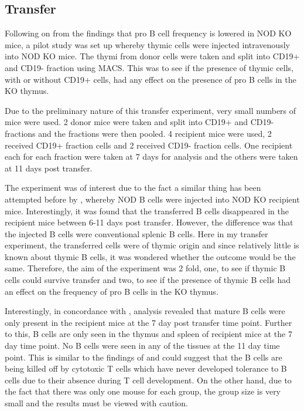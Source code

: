 


\subsection{Transfer}

Following on from the findings that pro B cell frequency is lowered in NOD KO mice, a pilot study was set up whereby thymic cells were injected intravenously into NOD KO mice.
The thymi from donor cells were taken and split into CD19+ and CD19- fraction using MACS.
This was to see if the presence of thymic cells, with or without CD19+ cells, had any effect on the presence of pro B cells in the KO thymus.

Due to the preliminary nature of this transfer experiment, very small numbers of mice were used.
2 donor mice were taken and split into CD19+ and CD19- fractions and the fractions were then pooled.
4 recipient mice were used, 2 received CD19+ fraction cells and 2 received CD19- fraction cells.
One recipient each for each fraction were taken at 7 days for analysis and the others were taken at 11 days post transfer.

The experiment was of interest due to the fact a similar thing has been attempted before by \citet{Serreze1998}, whereby NOD B cells were injected into NOD KO recipient mice.
Interestingly, it was found that the transferred B cells disappeared in the recipient mice between 6-11 days post transfer.
However, the difference was that the injected B cells were conventional splenic B cells.
Here in my transfer experiment, the transferred cells were of thymic origin and since relatively little is known about thymic B cells, it was wondered whether the outcome would be the same. 
Therefore, the aim of the experiment was 2 fold, one, to see if thymic B cells could survive transfer and two, to see if the presence of thymic B cells had an effect on the frequency of pro B cells in the KO thymus.

Interestingly, in concordance with \citet{Serreze1998}, analysis revealed that mature B cells were only present in the recipient mice at the 7 day post transfer time point.
Further to this, B cells are only seen in the thymus and spleen of recipient mice at the 7 day time point.
No B cells were seen in any of the tissues at the 11 day time point.
This is similar to the findings of \citet{Serreze1998} and could suggest that the B cells are being killed off by cytotoxic T cells which have never developed tolerance to B cells due to their absence during T cell development.
On the other hand, due to the fact that there was only one mouse for each group, the group size is very small and the results must be viewed with caution.

